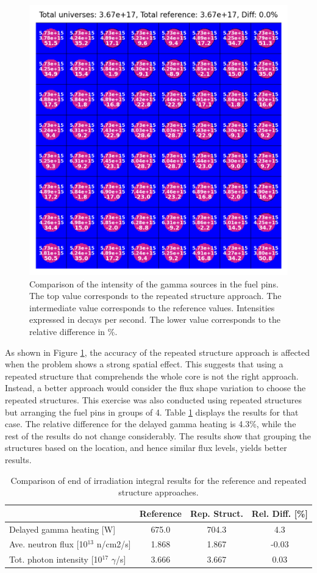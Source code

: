 \begin{figure}[htbp!] %
    \centering
    \includegraphics[width=0.65\linewidth]{figures/moaa-ref-uni-gamma-intens-b}
    \hfill
    \caption{Comparison of the intensity of the gamma sources in the fuel pins. The top value corresponds to the repeated structure approach. The intermediate value corresponds to the reference values. Intensities expressed in decays per second. The lower value corresponds to the relative difference in \%.}
    \label{fig:gamma-sources}
\end{figure}

As shown in Figure \ref{fig:gamma-sources}, the accuracy of the repeated structure approach is affected when the problem shows a strong spatial effect.
This suggests that using a repeated structure that comprehends the whole core is not the right approach.
Instead, a better approach would consider the flux shape variation to choose the repeated structures.
This exercise was also conducted using repeated structures but arranging the fuel pins in groups of 4.
Table \ref{table:verif2} displays the results for that case.
The relative difference for the delayed gamma heating is 4.3\%, while the rest of the results do not change considerably.
The results show that grouping the structures based on the location, and hence similar flux levels, yields better results.

\begin{table}[!htb]
  \centering
  \caption{Comparison of end of irradiation integral results for the reference and repeated structure approaches.}
  \label{table:verif2}
  \begin{tabular}{l|cc|c}
  \toprule
                                           & Reference  & Rep. Struct. & Rel. Diff. [\%] \\ %
  \midrule
   Delayed gamma heating [W]               & 675.0       & 704.3       &  4.3  \\
   Ave. neutron flux [10$^{13}$ n/cm2/s]   & 1.868       & 1.867       & -0.03 \\
   Tot. photon intensity [10$^{17}$ $\gamma$/s] &  3.666 & 3.667       &  0.03 \\
  \bottomrule
  \end{tabular}
\end{table}

